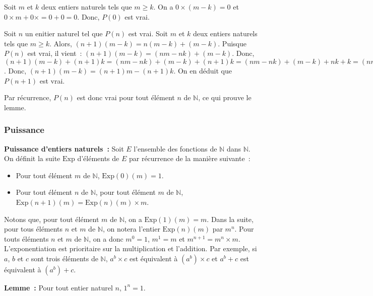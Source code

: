    Soit $m$ et $k$ deux entiers naturels tels que $m \geq k$.
    On a $0 \times (m-k) = 0$ et $0 \times m + 0 \times = 0 + 0 = 0$.
    Donc, $P(0)$ est vrai.

    Soit $n$ un enitier naturel tel que $P(n)$ est vrai. 
    Soit $m$ et $k$ deux entiers naturels tels que $m \geq k$. 
    Alors, $(n+1) (m-k) = n (m-k) + (m-k)$. 
    Puisque $P(n)$ est vrai, il vient : $(n+1)(m-k) = (n m - n k) + (m-k)$.
    Donc, $(n+1)(m-k) + (n+1) k = (n m - n k) + (m-k) + (n+1) k = (n m - n k) + (m-k) + n k + k = (n m - n k) + n k + (m-k) + k = n m + m = (n+1) m$.
    Donc, $(n+1)(m-k) = (n+1)m - (n+1) k$.
    On en déduit que $P(n+1)$ est vrai. 

    Par récurrence, $P(n)$ est donc vrai pour tout élément $n$ de $\mathbb{N}$, ce qui prouve le lemme.

    \done

\subsubsection{Puissance}
\label{subsub:puissance}

\noindent\textbf{Puissance d'entiers naturels :} Soit $E$ l'ensemble des fonctions de $\mathbb{N}$ dans $\mathbb{N}$. 
    On définit la suite $\mathrm{Exp}$ d'éléments de $E$ par récurrence de la manière suivante : 
    \begin{itemize}[nosep]
        \item Pour tout élément $m$ de $\mathbb{N}$, $\mathrm{Exp}(0)(m) = 1$.
        \item Pour tout élément $n$ de $\mathbb{N}$, pour tout élément $m$ de $\mathbb{N}$, $\mathrm{Exp}(n+1)(m) = \mathrm{Exp}(n)(m) \times m$.
    \end{itemize}
    Notons que, pour tout élément $m$ de $\mathbb{N}$, on a $\mathrm{Exp}(1)(m) = m$. 
    Dans la suite, pour tous éléments $n$ et $m$ de $\mathbb{N}$, on notera l'entier $\mathrm{Exp}(n)(m)$ par $m^n$. 
    Pour touts éléments $n$ et $m$ de $\mathbb{N}$, on a donc $m^0=1$, $m^1 = m$ et $m^{n+1} = m^n \times m$. 
    L'exponentiation est prioritaire sur la multiplication et l'addition. 
    Par exemple, si $a$, $b$ et $c$ sont trois éléments de $\mathbb{N}$, $a^b \times c$ est équivalent à $(a^b) \times c$ et $a^b + c$ est équivalent à $(a^b) + c$.

\medskip

\noindent\textbf{Lemme :} Pour tout entier naturel $n$, $1^n = 1$.

\medskip


